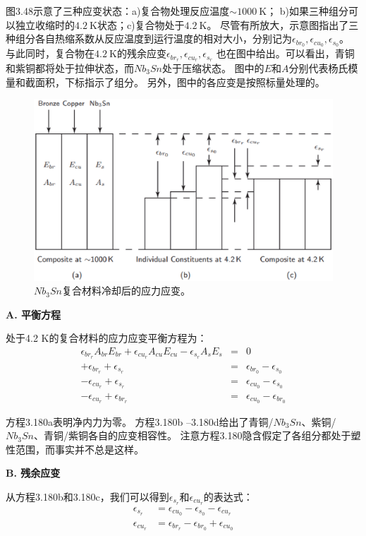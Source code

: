 图3.48示意了三种应变状态：a)复合物处理反应温度$\sim 1000\ \mathrm{K}$；
b)如果三种组分可以独立收缩时的$4.2\ \mathrm{K}$状态；c)复合物处于$4.2\ \mathrm{K}$。
尽管有所放大，示意图指出了三种组分各自热缩系数从反应温度到运行温度的相对大小，分别记为$\epsilon_{br_0},\epsilon_{cu_0}, \epsilon_{s_0}$。
与此同时，复合物在$4.2\ \mathrm{K}$的残余应变$\epsilon_{br_r},\epsilon_{cu_r}, \epsilon_{s_r}$
也在图中给出。可以看出，青铜和紫铜都将处于拉伸状态，而$Nb_3Sn$处于压缩状态。
图中的$E$和$A$分别代表杨氏模量和截面积，下标指示了组分。
另外，图中的各应变是按照标量处理的。
\begin{figure}[htbp]
	\centering
	\includegraphics[scale=0.5]{chpt3/figs/fig3.48.eps}
	\caption{$Nb_3Sn$复合材料冷却后的应力应变。}
\end{figure}

\textbf{A. 平衡方程}

处于4.2 K的复合材料的应力应变平衡方程为：
\begin{eqnarray}%
\epsilon_{br_r}A_{br}E_{br}+\epsilon_{cu_r}A_{cu}E_{cu}-\epsilon_{s_r}A_sE_s&=&0\\
+\epsilon_{br_r}+\epsilon_{s_r}&=&\epsilon_{br_0}-\epsilon_{s_0}\\
-\epsilon_{cu_r}+\epsilon_{s_r}&=&\epsilon_{cu_0}-\epsilon_{s_0}\\
-\epsilon_{cu_r}+\epsilon_{br_r}&=&\epsilon_{cu_0}-\epsilon_{br_0}
\end{eqnarray}

方程3.180a表明净内力为零。
方程3.180b –3.180d给出了青铜/$Nb_3Sn$、紫铜/$Nb_3Sn$、青铜/紫铜各自的应变相容性。
注意方程3.180隐含假定了各组分都处于塑性范围，而事实并不总是这样。

\textbf{B. 残余应变}

从方程3.180b和3.180c，我们可以得到$\epsilon_{s_r}$和$\epsilon_{cu_r}$的表达式：
\begin{eqnarray*}%
\epsilon_{s_r}&=\epsilon_{cu_0}-\epsilon_{s_0}-\epsilon_{cu_r}\\
\epsilon_{cu_r}&=\epsilon_{br_r}-\epsilon_{br_0}+\epsilon_{cu_0}
\end{eqnarray*}

